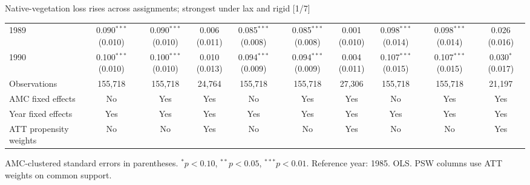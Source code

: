 \documentclass[aspectratio=169]{beamer}
\begin{document}
\begin{frame}{Native-vegetation loss rises across assignments; strongest under lax and rigid [1/7]}
{\begin{tabular}{@{}l*{9}{c}@{}}
1989 & \shortstack{0.090$^{***}$\\(0.010)} & \shortstack{0.090$^{***}$\\(0.010)} & \shortstack{0.006\\(0.011)} & \shortstack{0.085$^{***}$\\(0.008)} & \shortstack{0.085$^{***}$\\(0.008)} & \shortstack{0.001\\(0.010)} & \shortstack{0.098$^{***}$\\(0.014)} & \shortstack{0.098$^{***}$\\(0.014)} & \shortstack{0.026\\(0.016)} \\
1990 & \shortstack{0.100$^{***}$\\(0.010)} & \shortstack{0.100$^{***}$\\(0.010)} & \shortstack{0.010\\(0.013)} & \shortstack{0.094$^{***}$\\(0.009)} & \shortstack{0.094$^{***}$\\(0.009)} & \shortstack{0.004\\(0.011)} & \shortstack{0.107$^{***}$\\(0.015)} & \shortstack{0.107$^{***}$\\(0.015)} & \shortstack{0.030$^{*}$\\(0.017)} \\
\midrule
Observations & 155,718 & 155,718 & 24,764 & 155,718 & 155,718 & 27,306 & 155,718 & 155,718 & 21,197 \\
AMC fixed effects & No & Yes & Yes & No & Yes & Yes & No & Yes & Yes \\
Year fixed effects & Yes & Yes & Yes & Yes & Yes & Yes & Yes & Yes & Yes \\
ATT propensity weights & No & No & Yes & No & No & Yes & No & No & Yes \\
\bottomrule
\end{tabular}%
}
\vspace{0.1em}
{\tiny\color{ZMidGray} AMC-clustered standard errors in parentheses. $^{*}p<0.10$, $^{**}p<0.05$, $^{***}p<0.01$. Reference year: 1985. OLS. PSW columns use ATT weights on common support.}
\end{frame}
\end{document}
